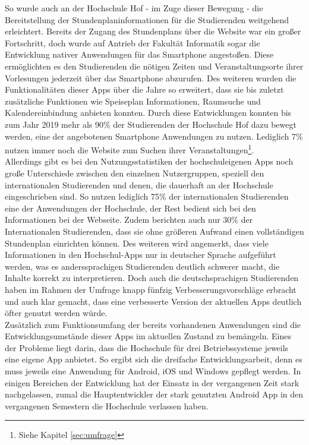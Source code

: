 So wurde auch an der Hochschule Hof - im Zuge dieser Bewegung - die Bereitstellung der Stundenplaninformationen für die Studierenden weitgehend erleichtert. Bereits der Zugang des Stundenplans über die Website war ein großer Fortschritt, doch wurde auf Antrieb der Fakultät Informatik sogar die Entwicklung nativer Anwendungen für das Smartphone angestoßen. Diese ermöglichten es den Studierenden die nötigen Zeiten und Veranstaltungsorte ihrer Vorlesungen jederzeit über das Smartphone  abzurufen. Des weiteren wurden die Funktionalitäten dieser \acp{App} über die Jahre so erweitert, dass sie bis zuletzt zusätzliche Funktionen wie Speiseplan Informationen, Raumsuche und Kalendereinbindung anbieten konnten. Durch diese Entwicklungen konnten bis zum Jahr 2019 mehr als 90\% der Studierenden der Hochschule Hof dazu bewegt werden, eine der angebotenen Smartphone Anwendungen zu nutzen. Lediglich 7\% nutzen immer noch die Website zum Suchen ihrer Veranstaltungen\footnote{Siehe Kapitel \ref{sec:umfrage}}.
\\
\linebreak
Allerdings gibt es bei den Nutzungsstatistiken der hochschuleigenen \acp{App} noch große Unterschiede zwischen den einzelnen Nutzergruppen, speziell den internationalen Studierenden und denen, die dauerhaft an der Hochschule eingeschrieben sind. So nutzen lediglich 75\% der internationalen Studierenden eine der Anwendungen der Hochschule, der Rest bedient sich bei den Informationen bei der Webseite. Zudem berichten auch nur 30\% der Internationalen Studierenden, dass sie ohne größeren Aufwand einen vollständigen Stundenplan einrichten können. Des weiteren wird angemerkt, dass viele Informationen in den Hochschul-\acp{App} nur in deutscher Sprache aufgeführt werden, was es anderssprachigen Studierenden deutlich schwerer macht, die Inhalte korrekt zu interpretieren. Doch auch die deutschsprachigen Studierenden haben im Rahmen der Umfrage knapp fünfzig Verbesserungsvorschläge erbracht und auch klar gemacht, dass eine verbesserte Version der aktuellen \acp{App} deutlich öfter genutzt werden würde.
\\
\linebreak
Zusätzlich zum Funktionsumfang der bereits vorhandenen Anwendungen sind die Entwicklungsumstände dieser \acp{App} im aktuellen Zustand zu bemängeln. Eines der Probleme liegt darin, dass die Hochschule für drei Betriebssysteme jeweils eine eigene \ac{App} anbietet. So ergibt sich die dreifache Entwicklungsarbeit, denn es muss jeweils eine Anwendung für Android, \ac{iOS} und Windows gepflegt werden. In einigen Bereichen der Entwicklung hat der Einsatz in der vergangenen Zeit stark nachgelassen, zumal die Hauptentwickler der stark genutzten Android \ac{App} in den vergangenen Semestern die Hochschule verlassen haben. 

